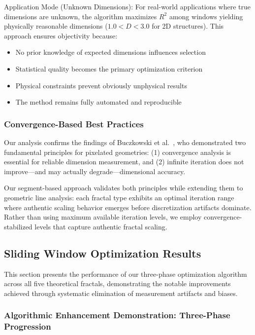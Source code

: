 \documentclass[preprint,12pt]{elsarticle}
\def\textbf#1{#1}%
\begin{document}
\textbf{Application Mode (Unknown Dimensions)}:
For real-world applications where true dimensions are unknown, the algorithm maximizes $R^2$ among windows yielding physically reasonable dimensions ($1.0 < D < 3.0$ for 2D structures). This approach ensures objectivity because:
\begin{itemize}
\item No prior knowledge of expected dimensions influences selection
\item Statistical quality becomes the primary optimization criterion
\item Physical constraints prevent obviously unphysical results
\item The method remains fully automated and reproducible
\end{itemize}

\subsubsection{Convergence-Based Best Practices}

Our analysis confirms the findings of Buczkowski et al.~\cite{buczkowski1998}, who demonstrated two fundamental principles for pixelated geometries: (1) convergence analysis is essential for reliable dimension measurement, and (2) infinite iteration does not improve—and may actually degrade—dimensional accuracy.

Our segment-based approach validates both principles while extending them to geometric line analysis: each fractal type exhibits an optimal iteration range where authentic scaling behavior emerges before discretization artifacts dominate. Rather than using maximum available iteration levels, we employ convergence-stabilized levels that capture authentic fractal scaling.

\subsection{Sliding Window Optimization Results}
\label{subsec:sliding_window_results}

This section presents the performance of our three-phase optimization algorithm across all five theoretical fractals, demonstrating the notable improvements achieved through systematic elimination of measurement artifacts and biases.

\subsubsection{Algorithmic Enhancement Demonstration: Three-Phase Progression}
\end{document}
